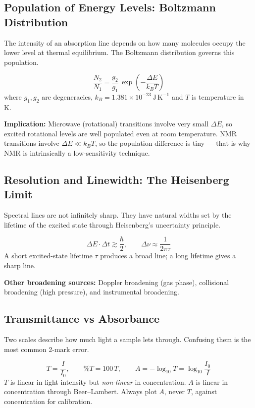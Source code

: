 \documentclass[12pt,a4paper]{article}
\begin{document}
\subsection{Population of Energy Levels: Boltzmann Distribution}
The intensity of an absorption line depends on how many molecules occupy the lower level at thermal equilibrium. The Boltzmann distribution governs this population.

\begin{tcolorbox}[formulabox, title={Boltzmann Population Ratio}]
\[
\frac{N_2}{N_1}=\frac{g_2}{g_1}\,\exp\!\left(-\frac{\Delta E}{k_B T}\right)
\]
where $g_1, g_2$ are degeneracies, $k_B=1.381\times10^{-23}\ \mathrm{J\,K^{-1}}$ and $T$ is temperature in K.
\end{tcolorbox}

\textbf{Implication:} Microwave (rotational) transitions involve very small $\Delta E$, so excited rotational levels are well populated even at room temperature. NMR transitions involve $\Delta E\ll k_BT$, so the population difference is tiny — that is why NMR is intrinsically a low-sensitivity technique.

\subsection{Resolution and Linewidth: The Heisenberg Limit}
Spectral lines are not infinitely sharp. They have natural widths set by the lifetime of the excited state through Heisenberg's uncertainty principle.

\begin{tcolorbox}[formulabox, title={Natural Linewidth}]
\[
\Delta E\cdot\Delta t \gtrsim \frac{\hbar}{2}, \qquad \Delta\nu \approx \frac{1}{2\pi\tau}
\]
A short excited-state lifetime $\tau$ produces a broad line; a long lifetime gives a sharp line.
\end{tcolorbox}

\textbf{Other broadening sources:} Doppler broadening (gas phase), collisional broadening (high pressure), and instrumental broadening.

\subsection{Transmittance vs Absorbance}
Two scales describe how much light a sample lets through. Confusing them is the most common 2-mark error.

\begin{tcolorbox}[formulabox, title={Transmittance and Absorbance}]
\[
T=\frac{I}{I_0}, \qquad \%T=100\,T, \qquad A=-\log_{10}T=\log_{10}\!\frac{I_0}{I}
\]
$T$ is linear in light intensity but \emph{non-linear} in concentration. $A$ is linear in concentration through Beer--Lambert. Always plot $A$, never $T$, against concentration for calibration.
\end{tcolorbox}
\end{document}
